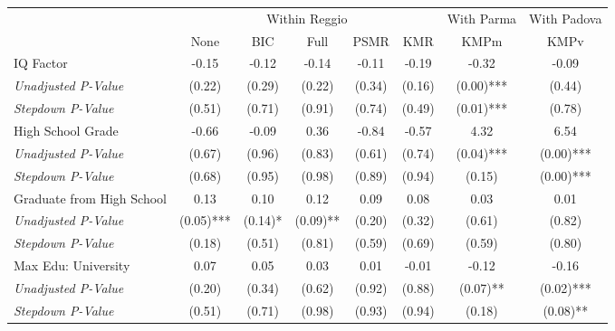 \begin{tabular}{l c c c c c c c}
\toprule
& \multicolumn{5}{c}{Within Reggio} & With Parma & With Padova \\\cmidrule(lr){2-6} \cmidrule(lr){7-7} \cmidrule(lr){8-8}
 & None & BIC & Full & PSMR & KMR & KMPm & KMPv \\
\midrule
IQ Factor & -0.15 & -0.12 & -0.14 & -0.11 & -0.19 & -0.32 & -0.09 \\
\quad \textit{Unadjusted P-Value} & (0.22) & (0.29) & (0.22) & (0.34) & (0.16) & (0.00)*** & (0.44) \\
\quad \textit{Stepdown P-Value} & (0.51) & (0.71) & (0.91) & (0.74) & (0.49) & (0.01)*** & (0.78) \\
High School Grade & -0.66 & -0.09 & 0.36 & -0.84 & -0.57 & 4.32 & 6.54 \\
\quad \textit{Unadjusted P-Value} & (0.67) & (0.96) & (0.83) & (0.61) & (0.74) & (0.04)*** & (0.00)*** \\
\quad \textit{Stepdown P-Value} & (0.68) & (0.95) & (0.98) & (0.89) & (0.94) & (0.15) & (0.00)*** \\
Graduate from High School & 0.13 & 0.10 & 0.12 & 0.09 & 0.08 & 0.03 & 0.01 \\
\quad \textit{Unadjusted P-Value} & (0.05)*** & (0.14)* & (0.09)** & (0.20) & (0.32) & (0.61) & (0.82) \\
\quad \textit{Stepdown P-Value} & (0.18) & (0.51) & (0.81) & (0.59) & (0.69) & (0.59) & (0.80) \\
Max Edu: University & 0.07 & 0.05 & 0.03 & 0.01 & -0.01 & -0.12 & -0.16 \\
\quad \textit{Unadjusted P-Value} & (0.20) & (0.34) & (0.62) & (0.92) & (0.88) & (0.07)** & (0.02)*** \\
\quad \textit{Stepdown P-Value} & (0.51) & (0.71) & (0.98) & (0.93) & (0.94) & (0.18) & (0.08)** \\
\bottomrule
\end{tabular}
